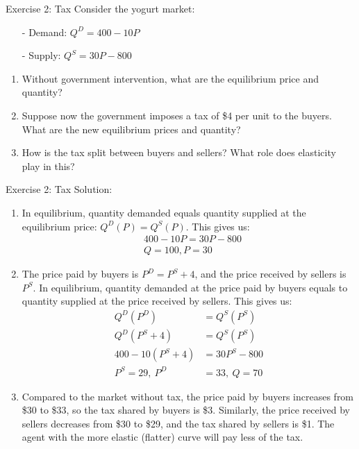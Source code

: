 \documentclass[9pt, handout]{beamer}
\begin{document}
\begin{frame}{Exercise 2: Tax}
Consider the yogurt market: 
\begin{itemize}
    \item[-] Demand: $Q^D = 400 - 10P$
    \item[-] Supply: $Q^S = 30P - 800$
\end{itemize}
\begin{enumerate}
    \item Without government intervention, what are the equilibrium price and quantity?
    \item Suppose now the government imposes a tax of \$4 per unit to the buyers. What are the new equilibrium prices and quantity?
    \item How is the tax split between buyers and sellers? What role does elasticity play in this?
\end{enumerate}
\vspace{1in}
\end{frame}

\begin{frame}{Exercise 2: Tax}
    Solution: 
    \begin{enumerate}
        \item In equilibrium, quantity demanded equals quantity supplied at the equilibrium price: $Q^D(P)=Q^S(P)$. This gives us: 
        \begin{align*}
            & 400 - 10P = 30P - 800 \\
            & Q = 100, P = 30
        \end{align*}
        \item The price paid by buyers is $P^D = P^S + 4$, and the price received by sellers is $P^S$. In equilibrium, quantity demanded at the price paid by buyers equals to quantity supplied at the price received by sellers. This gives us: 
        \begin{align*}
            Q^D(P^D) &= Q^S(P^S)\\
            Q^D(P^S + 4) &= Q^S(P^S)\\
            400 - 10(P^S + 4) &= 30P^S - 800 \\
            P^S = 29,\:P^D &= 33, \: Q = 70
        \end{align*}
        \item Compared to the market without tax, the price paid by buyers increases from \$30 to \$33, so the tax shared by buyers is \$3. Similarly, the price received by sellers decreases from \$30 to \$29, and the tax shared by sellers is \$1.  The agent with the more elastic (flatter) curve will pay less of the tax.
    \end{enumerate}
\end{frame}
\end{document}
